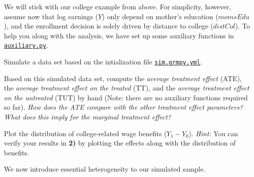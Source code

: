    We will stick with our college example from above. For simplicity, however, assume now that log earnings ($Y$) only depend on mother's education ($momsEdu$), and the enrollment decision is solely driven by distance to college ($distCol$). To help you along with the analysis, we have set up some auxiliary functions in  \href{https://github.com/HumanCapitalAnalysis/microeconometrics/blob/prset_grmpy/problem-sets/04-generalized-roy-model/sources/auxiliary.py}{\texttt{auxiliary.py}}.


\begin{boenumerate}
  \item Simulate a data set based on the intialization file \href{https://github.com/HumanCapitalAnalysis/microeconometrics/blob/prset_grmpy/problem-sets/04-generalized-roy-model/sources/sim.grmpy.yml}{\texttt{sim.grmpy.yml}}. 
  
  \item Based on this simulated data set, compute the \emph{average treatment effect} (ATE), the \emph{average treatment effect on the treated} (TT), and the \emph{average treatment effect on the untreated} (TUT) by hand (Note: there are no auxiliary functions required so far). \emph{How does the ATE compare with the other treatment effect parameters?} \emph{What does this imply for the marginal treatment effect?}
  
  \item Plot the distribution of college-related wage benefits ($Y_1 - Y_0$). \textit{Hint:} You can verify your results in \textbf{2)} by plotting the effects along with the distribution of benefits.
  
\end{boenumerate}

  \noindent We now introduce essential heterogeneity to our simulated sample.

